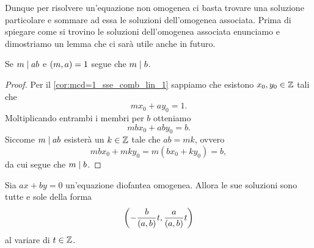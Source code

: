 Dunque per risolvere un'equazione non omogenea ci basta trovare una soluzione particolare e sommare ad essa le soluzioni dell'omogenea associata. Prima di spiegare come si trovino le soluzioni dell'omogenea associata enunciamo e dimostriamo un lemma che ci sarà utile anche in futuro.

\begin{lemma} \label{lem:divide_prod_coprimo_col_primo}
    Se $m \mid ab$ e $\left(m, a\right) = 1$ segue che $m \mid b$.
\end{lemma}
\begin{proof}
    Per il \autoref{cor:mcd=1_sse_comb_lin_1} sappiamo che esistono $x_0, y_0 \in \mathbb{Z}$ tali che \[
        mx_0 + ay_0 = 1.    
    \] Moltiplicando entrambi i membri per $b$ otteniamo \[
        mbx_0 + aby_0 = b.    
    \] Siccome $m \mid ab$ esisterà un $k \in \mathbb{Z}$ tale che $ab = mk$, ovvero \[
        mbx_0 + mky_0 = m(bx_0 + ky_0) = b,     
    \] da cui segue che $m \mid b$.
\end{proof}

\begin{proposition}
    Sia $ax+by = 0$ un'equazione diofantea omogenea. Allora le sue soluzioni sono tutte e sole della forma \begin{equation}
        \left(-\frac{b}{\left(a, b\right)}t, \frac{a}{\left(a, b\right)}t \right)
    \end{equation} al variare di $t \in \mathbb{Z}$.
\end{proposition}